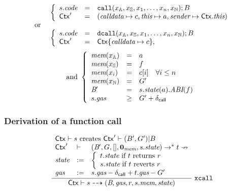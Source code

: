 $$
\begin{array}{ll}
&\left\{
    \begin{array}{lll}
    s.\textit{code} &=&  \mathtt{call}(x_{\mathbb{A}},x_{\mathbb{S}},x_1,\dots,x_n, x_{\mathbb{N}});B \\
    \mathsf{Ctx}' &=&(\textit{calldata}\mapsto c,
     \textit{this}\mapsto a,
     \textit{sender}\mapsto\mathsf{Ctx}.\textit{this})
    \end{array}\right.\\
\hbox{ or }&\\
&\left\{
    \begin{array}{lll}
    s.\textit{code} &=& \mathtt{dcall}(x_{\mathbb{A}},x_{\mathbb{S}},x_1,\dots,x_n, x_{\mathbb{N}});B \\
    \mathsf{Ctx}'&=&\mathsf{Ctx}\{\textit{calldata}\mapsto c\},
    \end{array}
    \right.
\end{array}
$$
$$
\begin{array}{cc}
\hbox{and }
\left\{
    \begin{array}{lll}
    \textit{mem}(x_{\mathbb{A}}) & = & a \\
    \textit{mem}(x_{\mathbb{S}}) & = & f \\
    \textit{mem}(x_i) & = & c[i]\quad \forall i\leq n \\
    \textit{mem}(x_{\mathbb{N}}) & = & G' \\
    \textit{B}{}' &=& s.\textit{state}(a).\textit{ABI}(f)\\
    s.\textit{gas} &\geq& G' + \delta_{\mathsf{call}}
    \end{array}\right.
\end{array}
$$
\subsubsection{Derivation of a function call}

\begin{table}[ht]
$$
\begin{array}{c}
\dfrac{
    \begin{array}{lll}
    \multicolumn{3}{l}{\textrm{$\ctx\vdash s$ creates $\ctx'\vdash (B',G')|B$}}\\
     \mathsf{\ctx'}&\vdash& 
     (\bytecode{}{}',G,[],\zMem,s.\state) \to^* t \nrightarrow\\
     \state &:=& \left\{
    \begin{array}{l}
        \textrm{$t.\state$ if $t$ returns $r$}\\
        \textrm{$s.\state$ if $t$ reverts $r$}
    \end{array}\right.\\
    \textit{gas} &:=& s.\textit{gas}-\dcl+t.\textit{gas}-G'
    \end{array}
}{
 \ctx
 \vdash
 s
 \rar 
 (\bytecode,\textit{gas},r,s.\textit{mem},
 \state
 )
}\rlab{xcall}
\end{array}
$$
\end{table}

